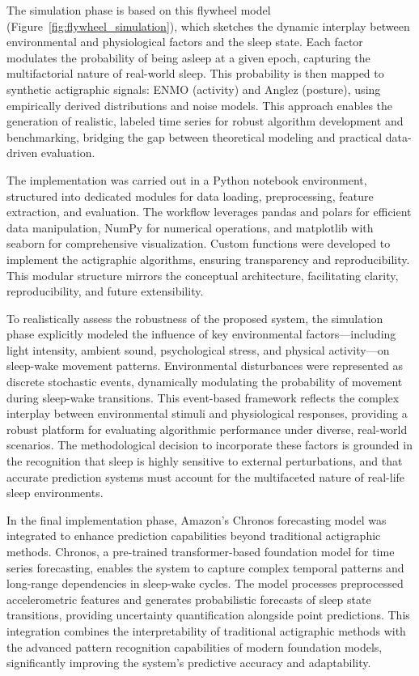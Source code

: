\documentclass[conference]{IEEEtran}
\begin{document}
The simulation phase is based on this flywheel model (Figure~\ref{fig:flywheel_simulation}), which sketches the dynamic interplay between environmental and physiological factors and the sleep state. Each factor modulates the probability of being asleep at a given epoch, capturing the multifactorial nature of real-world sleep. This probability is then mapped to synthetic actigraphic signals: ENMO (activity) and Anglez (posture), using empirically derived distributions and noise models. This approach enables the generation of realistic, labeled time series for robust algorithm development and benchmarking, bridging the gap between theoretical modeling and practical data-driven evaluation.

The implementation was carried out in a Python notebook environment, structured into dedicated modules for data loading, preprocessing, feature extraction, and evaluation. The workflow leverages pandas and polars for efficient data manipulation, NumPy for numerical operations, and matplotlib with seaborn for comprehensive visualization. Custom functions were developed to implement the actigraphic algorithms, ensuring transparency and reproducibility. This modular structure mirrors the conceptual architecture, facilitating clarity, reproducibility, and future extensibility.

To realistically assess the robustness of the proposed system, the simulation phase explicitly modeled the influence of key environmental factors—including light intensity, ambient sound, psychological stress, and physical activity—on sleep-wake movement patterns. Environmental disturbances were represented as discrete stochastic events, dynamically modulating the probability of movement during sleep-wake transitions. This event-based framework reflects the complex interplay between environmental stimuli and physiological responses, providing a robust platform for evaluating algorithmic performance under diverse, real-world scenarios. The methodological decision to incorporate these factors is grounded in the recognition that sleep is highly sensitive to external perturbations, and that accurate prediction systems must account for the multifaceted nature of real-life sleep environments.

In the final implementation phase, Amazon's Chronos forecasting model \cite{ansari2024chronos} was integrated to enhance prediction capabilities beyond traditional actigraphic methods. Chronos, a pre-trained transformer-based foundation model for time series forecasting, enables the system to capture complex temporal patterns and long-range dependencies in sleep-wake cycles. The model processes preprocessed accelerometric features and generates probabilistic forecasts of sleep state transitions, providing uncertainty quantification alongside point predictions. This integration combines the interpretability of traditional actigraphic methods with the advanced pattern recognition capabilities of modern foundation models, significantly improving the system's predictive accuracy and adaptability.
\end{document}
